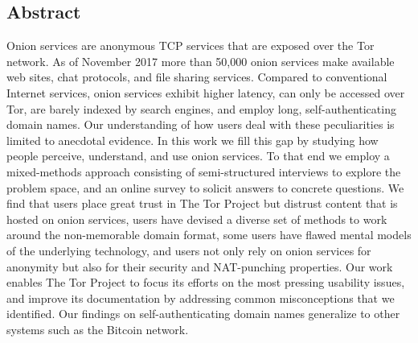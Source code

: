 \subsection*{Abstract}
Onion services are anonymous TCP services that are exposed over the Tor network.
As of November 2017 more than 50,000 onion services make available web sites,
chat protocols, and file sharing services.  Compared to conventional Internet
services, onion services exhibit higher latency, can only be accessed over Tor,
are barely indexed by search engines, and employ long, self-authenticating
domain names.  Our understanding of how users deal with these peculiarities is
limited to anecdotal evidence.
In this work we fill this gap by studying how people perceive, understand, and
use onion services.  To that end we employ a mixed-methods approach consisting
of semi-structured interviews to explore the problem space, and an online survey
to solicit answers to concrete questions.  We find that \first users place great
trust in The Tor Project but distrust content that is hosted on onion services,
\second users have devised a diverse set of methods to work around the
non-memorable domain format, \third some users have flawed mental models of the
underlying technology, and \fourth users not only rely on onion services for
anonymity but also for their security and NAT-punching properties.
Our work enables The Tor Project to focus its efforts on the most pressing
usability issues, and improve its documentation by addressing common
misconceptions that we identified.  Our findings on self-authenticating domain
names generalize to other systems such as the Bitcoin network.
